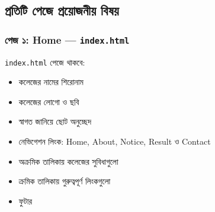 \subsection{প্রতিটি পেজে প্রয়োজনীয় বিষয়}

\subsubsection{পেজ ১: Home — \texttt{index.html}}

\texttt{index.html} পেজে থাকবে:
\par\noindent
\begin{minipage}[t]{.48\linewidth}\vspace{0pt}
\begin{itemize}
\item কলেজের নামের শিরোনাম
\item কলেজের লোগো ও ছবি
\item স্বাগত জানিয়ে ছোট অনুচ্ছেদ
\item নেভিগেশন লিংক: Home, About, Notice, Result ও Contact
\end{itemize}
\end{minipage}\hfill
\begin{minipage}[t]{.48\linewidth}\vspace{0pt}
\begin{itemize}
\item অক্রমিক তালিকায় কলেজের সুবিধাগুলো
\item ক্রমিক তালিকায় গুরুত্বপূর্ণ লিংকগুলো
\item ফুটার
\end{itemize}
\end{minipage}\par


